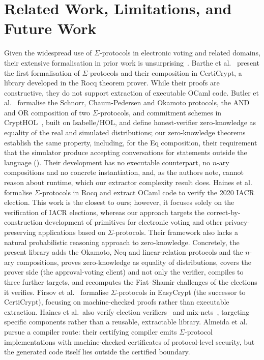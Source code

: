 \documentclass[sigconf,anonymous,review]{acmart}
\begin{document}
\section{Related Work, Limitations, and Future Work}\label{rel_work}
Given the widespread use of $\Sigma$-protocols in electronic voting and related domains, their extensive formalisation in prior work is unsurprising~\cite{5552642,9519460,butler2021formalising,10.1145/3319535.3354247,287095,almeida2010certifying,10221929,10.1145/3594735}.  Barthe et al.~\cite{5552642} present the first formalisation of $\Sigma$-protocols and their composition in CertiCrypt, a library developed in the Rocq theorem prover. While their proofs are constructive, they do not support extraction of executable OCaml code. Butler et al.~\cite{butler2021formalising} formalise the Schnorr, Chaum-Pedersen and Okamoto protocols, the AND and OR composition of two $\Sigma$-protocols, and commitment schemes in CryptHOL~\cite{10.1007/978-3-662-49498-1_20}, built on Isabelle/HOL, and define honest-verifier zero-knowledge as equality of the real and simulated distributions; our zero-knowledge theorems establish the same property, including, for the Eq composition, their requirement that the simulator produce accepting conversations for statements outside the language (\texttt{}). Their development has no executable counterpart, no $n$-ary compositions and no concrete instantiation, and, as the authors note, cannot reason about runtime, which our extractor complexity result does. Haines et al.~\cite{287095} formalise $\Sigma$-protocols in Rocq and extract OCaml code to verify the 2020 IACR election. This work is the closest to ours; however, it focuses solely on the verification of IACR elections, whereas our approach targets the correct-by-construction development of primitives for electronic voting and other privacy-preserving applications based on $\Sigma$-protocols. Their framework also lacks a natural probabilistic reasoning approach to zero-knowledge. Concretely, the present library adds the Okamoto, Neq and linear-relation protocols and the $n$-ary compositions, proves zero-knowledge as equality of distributions, covers the prover side (the approval-voting client) and not only the verifier, compiles to three further targets, and recomputes the Fiat--Shamir challenges of the elections it verifies. Firsov et al.~\cite{10221929} formalise $\Sigma$-protocols in EasyCrypt (the successor to CertiCrypt), focusing on machine-checked proofs rather than executable extraction. Haines et al.\ also verify election verifiers~\cite{10.1145/3319535.3354247} and mix-nets~\cite{9519460}, targeting specific components rather than a reusable, extractable library. Almeida et al.~\cite{almeida2010certifying} pursue a compiler route: their certifying compiler emits $\Sigma$-protocol implementations with machine-checked certificates of protocol-level security, but the generated code itself lies outside the certified boundary. 
\end{document}
